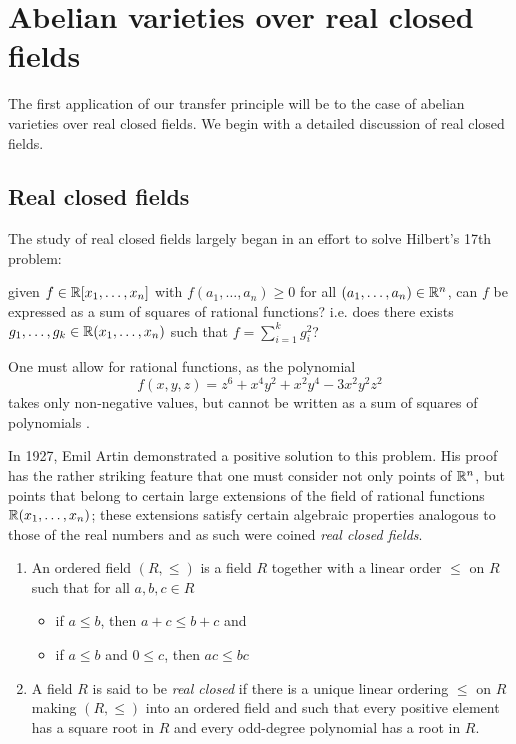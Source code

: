 

\chapter{Abelian varieties over real closed fields}
The first application of our transfer principle will be to the case of abelian varieties over real closed fields. We begin with a detailed discussion of real closed fields.

\section{Real closed fields}
The study of real closed fields largely began in an effort to solve Hilbert's 17th problem: 
\begin{center}
given $f\in\mathbb{R}[x_1,\dots,x_n]$ with $f(a_1,\dots, a_n)\geq 0$ for all $(a_1,\dots,a_n)\in\mathbb{R}^n$, can $f$ be expressed as a sum of squares of rational functions? i.e. does there exists $g_1,\dots, g_k\in \mathbb{R}(x_1,\dots, x_n)$ such that $f=\sum_{i=1}^k g_i^2$?
\end{center}

One must allow for rational functions, as the polynomial $$f(x,y,z)=z^6+x^4y^2+x^2y^4-3x^2y^2z^2$$ takes only non-negative values, but cannot be written as a sum of squares of polynomials \cite{roy2000role}.

In 1927, Emil Artin demonstrated a positive solution to this problem. His proof has the rather striking feature that one must consider not only points of $\mathbb{R}^n$, but points that belong to certain large extensions of the field of rational functions $\mathbb{R}(x_1,\dots,x_n)$; these extensions satisfy certain algebraic properties analogous to those of the real numbers and as such were coined \emph{real closed fields}.

\begin{definition}
	\begin{enumerate}
		\item An ordered field $(R,\leq)$ is a field $R$ together with a linear order $\leq$ on $R$ such that for all $a,b,c\in R$ 
			\begin{itemize}
				\item if $a\leq b$, then $a+c\leq b+c$ and
				\item if $a\leq b$ and $0\leq c$, then $ac\leq bc$
			\end{itemize}
		\item A field $R$ is said to be \emph{real closed} if there is a unique linear ordering $\leq$ on $R$ making $(R,\leq)$ into an ordered field and such that every positive element has a square root in $R$ and every odd-degree polynomial has a root in $R$.
	\end{enumerate}
\end{definition}


